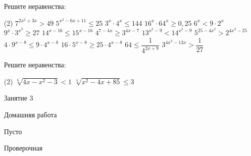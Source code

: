 \begin{class}[number=2]
	\begin{listofex}
		\item Решите неравенства: %
		\begin{tasks}(2)
			\task \( 7^{2x^2+3x}>49 \)
			\task \( 5^{x^2-6x+11} \le 25 \)
			\task \( 3^x \cdot 4^x  \le 144 \)
			\task \( 16^x \cdot 64^x \ge 0,25 \)
			\task \( 6^x < 9 \cdot 2^x \)
			\task \( 9^x \cdot 3^{x^2} \ge 27 \)
			\task \( 14^{x-16} \le 15^{x-16} \)
			\task \( 4^{7-4x} \ge 3^{4x-7} \)
			\task \( 13^{x^2-9}<14^{x^2-9} \)
			\task \( 5^{25-4x^2}>2^{4x^2-25} \)
			\task \( 4 \cdot 9^{x-8} \le 9 \cdot 4^{x-8} \)
			\task \( 16 \cdot 5^{x-8} \ge 25 \cdot 4^{x-8} \)
			\task \( 64 \le \dfrac{ 1 }{ 4^{2x+9} } \)
			\task \( 3^{4x^2-13x}>\dfrac{ 1 }{ 27 } \)
		\end{tasks}
		\item Решите неравенства:
		\begin{tasks}(2)
			\task \( \sqrt[6]{4x-x^2-3}<1 \)
			\task \( \sqrt[4]{x^2-4x+85}\le 3 \)
		\end{tasks}
	\end{listofex}
\end{class}
\begin{class}[number=3]
	\begin{listofex}
		\item Занятие 3
	\end{listofex}
\end{class}

\begin{homework}[number=3]
	\begin{listofex}
		\item Домашняя работа
	\end{listofex}
\end{homework}

\begin{class}[number=4]
	\begin{listofex}
		\item Пусто
	\end{listofex}
\end{class}


\begin{exam}
	\begin{listofex}
		\item Проверочная
	\end{listofex}
\end{exam}
